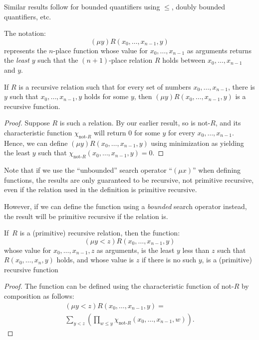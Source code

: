\documentclass[12pt]{report}
\theoremstyle{nonumberplain}
\newtheorem{proof}{Proof}
\begin{document}
\medskip\noindent Similar results follow for bounded quantifiers using $\le$, doubly bounded quantifiers, etc.

The notation:
\[
(μy) R(x_0, \dotsc, x_{n-1}, y)
\]
represents the $n$-place function whose value for $x_0, \dotsc, x_{n-1}$ as arguments returns the \emph{least} $y$ such that the $(n+1)$-place relation $R$ holds between  $x_0, \dotsc, x_{n-1}$ and $y$.

\begin{mt}
If $R$ is a recursive relation such that for every set of numbers $x_0, \dotsc, x_{n-1}$, there is $y$ such that $x_0, \dotsc, x_{n-1}, y$ holds for some $y$, then $(μy) R(x_0, \dotsc, x_{n-1}, y)$ is a recursive function.
 \end{mt}
\begin{proof}
Suppose $R$ is such a relation. By our earlier result, so is not-$R$, and its characteristic function $χ_{\text{not-}R}$ will return 0 for some $y$ for every $x_0, \dotsc, x_{n-1}$. Hence, we can define $(μy) R(x_0, \dotsc, x_{n-1}, y)$ using minimization as yielding the least $y$ such that $χ_{\text{not-}R}(x_0, \dotsc, x_{n-1}, y) = 0$.
\end{proof}

Note that if we use the ``unbounded'' search operator ``$(μx)$'' when defining functions, the results are only guaranteed to be recursive, not primitive recursive, even if the relation used in the definition is primitive recursive.

However, if we can define the function using a \emph{bounded} search operator instead, the result will be primitive recursive if the relation is.
\begin{mt}
If \,$R$ is a (primitive) recursive relation, then the function:
\[
(μy < z)R(x_0, \dotsc, x_{n-1}, y)
\]
whose value for $x_0, \dotsc, x_{n-1}, z$ as arguments, is the least $y$ less than $z$ such that $R(x_0, \dotsc, x_n, y)$ holds, and whose value is $z$ if there is no such $y$, is a (primitive) recursive function
\end{mt}
\begin{proof}
The function can be defined using the characteristic function of not-$R$ by composition as follows:
\begin{multline*}
(μy < z)R(x_0, \dotsc, x_{n-1}, y) =\\ \sum_{y < z} \left(\prod_{w \le y} χ_{\text{not-}R}(x_0, \dotsc , x_{n-1}, w)\right).
\end{multline*}

\end{proof}
\end{document}
